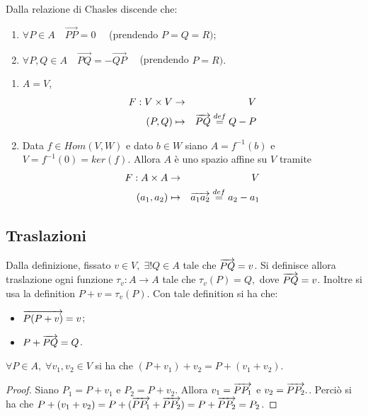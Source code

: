  \begin{remark}
 Dalla relazione di Chasles discende che: 
 \begin{enumerate}[label=\bf\alph*)]
	\item $\forall P\in A\quad\overrightarrow{PP}=0\quad$ (prendendo $P=Q=R);$
	\item $\forall P,Q\in A\quad\overrightarrow{PQ}=-\overrightarrow{QP}\quad$ (prendendo $P=R).$
 \end{enumerate}
 \end{remark}
 
 \begin{example}
	\begin{enumerate}[label=\bf\Roman*)]
 \item $A=V$,
 \begin{eqnarray*}
	F: V\times V & \to & V \\
	(P,Q) & \mapsto & \overrightarrow{PQ}\stackrel{def}{=}Q-P
 \end{eqnarray*}
 \item Data $f\in Hom(V,W)$ e dato $b\in W$ siano $A=f^{-1}(b)$ e $V=f^{-1}(0)=ker(f)$.
 Allora $A$ è uno spazio affine su $V$ tramite
 \begin{eqnarray*}
  F: A\times A & \to & V \\
  (a_1,a_2) & \mapsto & \overrightarrow{a_1a_2}\stackrel{def}{=}a_2-a_1
 \end{eqnarray*}
 \end{enumerate}
 \end{example}
 
	\subsection{Traslazioni}
 
 Dalla definizione, fissato $v\in V,\;\exists !Q\in A$ tale che $\overrightarrow{PQ}=v$.
 Si definisce allora traslazione ogni funzione $\tau_v:A\to A$ tale che $\tau_v(P)=Q,$ dove $\overrightarrow{PQ}=v$.
 Inoltre si usa la definition $P+v=\tau_v(P)$.
 Con tale definition si ha che:
 \begin{itemize}
	\item $\overrightarrow{P(P+v)}= {v}$;
	\item $P+\overrightarrow{PQ}=Q$.
 \end{itemize}
 
 \begin{lemma}
 $\forall P\in A,\; \forall v_1,v_2\in V$ si ha che $(P+v_1)+v_2=P+(v_1+v_2).$
 \end{lemma}
 
 \begin{proof}
 Siano $P_1=P+v_1$ e $P_2=P+v_2$. Allora $v_1=\overrightarrow{PP_1}$ e
 $v_2=\overrightarrow{PP_2}.$.
 Perciò si ha che $P+(v_1+v_2)=P+(\overrightarrow{PP_1}+\overrightarrow{PP_2})=P+\overrightarrow{PP_2}=P_2$.
 \end{proof}
 
